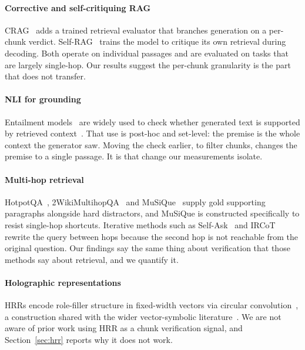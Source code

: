 \documentclass[conference]{IEEEtran}
\begin{document}
\paragraph{Corrective and self-critiquing RAG}
CRAG~\cite{yan2024corrective} adds a trained retrieval evaluator that branches
generation on a per-chunk verdict. Self-RAG~\cite{asai2023self} trains the model
to critique its own retrieval during decoding. Both operate on individual
passages and are evaluated on tasks that are largely single-hop. Our results
suggest the per-chunk granularity is the part that does not transfer.

\paragraph{NLI for grounding}
Entailment models~\cite{bowman2015snli, williams2018mnli, he2023debertav3} are
widely used to check whether generated text is supported by retrieved
context~\cite{es2024ragas}. That use is post-hoc and set-level: the premise is
the whole context the generator saw. Moving the check earlier, to filter chunks,
changes the premise to a single passage. It is that change our measurements
isolate.

\paragraph{Multi-hop retrieval}
HotpotQA~\cite{yang2018hotpotqa}, 2WikiMultihopQA~\cite{ho20202wiki} and
MuSiQue~\cite{trivedi2022musique} supply gold supporting paragraphs alongside
hard distractors, and MuSiQue is constructed specifically to resist single-hop
shortcuts. Iterative methods such as Self-Ask~\cite{press2023selfask} and
IRCoT~\cite{trivedi2023ircot} rewrite the query between hops because the second
hop is not reachable from the original question. Our findings say the same thing
about verification that those methods say about retrieval, and we quantify it.

\paragraph{Holographic representations}
HRRs encode role-filler structure in fixed-width vectors via circular
convolution~\cite{plate1995holographic, plate2003book}, a construction shared
with the wider vector-symbolic literature~\cite{kanerva2009hyperdimensional,
nickel2016hole}. We are not aware of prior work using HRR as a chunk
verification signal, and Section~\ref{sec:hrr} reports why it does not work.
\end{document}
